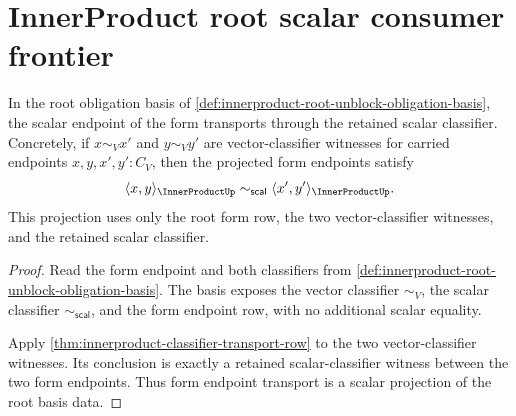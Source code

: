\section{InnerProduct root scalar consumer frontier}
\label{sec:innerproduct-root-scalar-consumer-frontier}

\begin{theorem}
\label{thm:innerproduct-root-scalar-projection-transport}
In the root obligation basis of
\autoref{def:innerproduct-root-unblock-obligation-basis}, the scalar endpoint
of the form transports through the retained scalar classifier. Concretely, if
$x\sim_Vx'$ and $y\sim_Vy'$ are vector-classifier witnesses for carried
endpoints $x,y,x',y':C_V$, then the projected form endpoints satisfy
$$
\langle x,y\rangle_{\InnerProductUp}
\sim_{\mathsf{scal}}
\langle x',y'\rangle_{\InnerProductUp}.
$$
This projection uses only the root form row, the two vector-classifier
witnesses, and the retained scalar classifier.
\end{theorem}
\begin{proof}
Read the form endpoint and both classifiers from
\autoref{def:innerproduct-root-unblock-obligation-basis}. The basis exposes
the vector classifier $\sim_V$, the scalar classifier
$\sim_{\mathsf{scal}}$, and the form endpoint row, with no additional scalar
equality.

Apply \autoref{thm:innerproduct-classifier-transport-row} to the two
vector-classifier witnesses. Its conclusion is exactly a retained
scalar-classifier witness between the two form endpoints. Thus form endpoint
transport is a scalar projection of the root basis data.
\end{proof}


